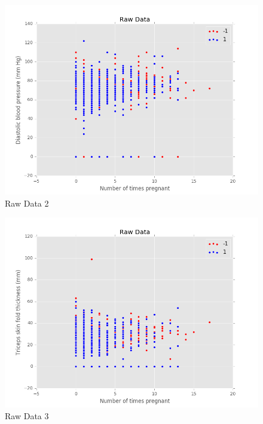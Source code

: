 \documentclass[12pt]{article}
\begin{document}
\begin{figure}[H]
\begin{center}
\includegraphics[scale=0.66]{graph2.png}
\caption{Raw Data 2}
\label{Raw Data 2}
\end{center}
\end{figure}

\begin{figure}[H]
\begin{center}
\includegraphics[scale=0.66]{graph3.png}
\caption{Raw Data 3}
\label{Raw Data 3}
\end{center}
\end{figure}
\end{document}
